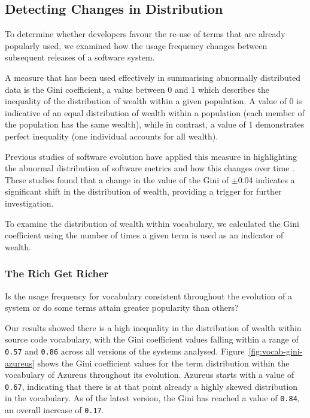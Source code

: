 \subsection{Detecting Changes in Distribution} %
\label{sub:detecting_changes_in_distribution}

To determine whether developers favour the re-use of terms that are already popularly used, we examined how the usage frequency changes between subsequent releases of a software system.

A measure that has been used effectively in summarising abnormally distributed data is the Gini coefficient, a value between 0 and 1 which describes the inequality of the distribution of wealth within a given population. A value of 0 is indicative of an equal distribution of wealth within a population (\ie each member of the population has the same wealth), while in contrast, a value of 1 demonstrates perfect inequality (\ie one individual accounts for all wealth).

Previous studies of software evolution have applied this measure in highlighting the abnormal distribution of software metrics and how this changes over time \cite{Vasa09a}. These studies found that a change in the value of the Gini of $\pm$0.04 indicates a significant shift in the distribution of wealth, providing a trigger for further investigation. 

To examine the distribution of wealth within vocabulary, we calculated the Gini coefficient using the number of times a given term is used as an indicator of wealth.


\subsubsection{The Rich Get Richer} %
\label{sub:the_rich_get_richer}

Is the usage frequency for vocabulary consistent throughout the evolution of a system or do some terms attain greater popularity than others?

Our results showed there is a high inequality in the distribution of wealth within source code vocabulary, with the Gini coefficient values falling within a range of \texttt{0.57} and \texttt{0.86} across all versions of the systems analysed. Figure~\ref{fig:vocab-gini-azureus} shows the Gini coefficient values for the term distribution within the vocabulary of Azureus throughout its evolution. Azureus starts with a value of \texttt{0.67}, indicating that there is at that point already a highly skewed distribution in the vocabulary. As of the latest version, the Gini has reached a value of \texttt{0.84}, an overall increase of \texttt{0.17}.

